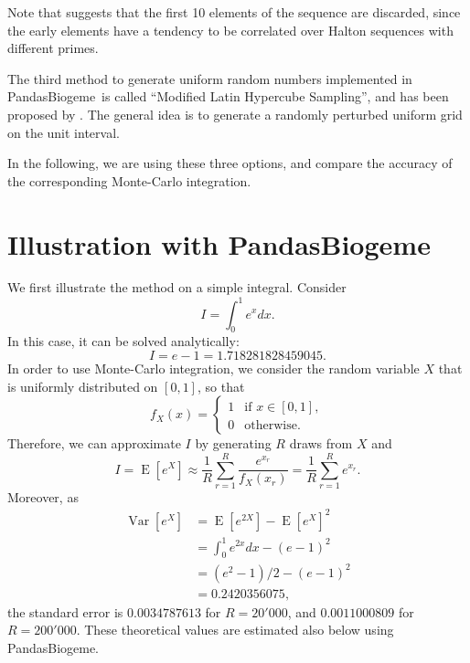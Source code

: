 \documentclass[12pt,a4paper]{article}
\newcommand{\expect}{\operatorname{E}}
\newcommand{\var}{\operatorname{Var}}
\newcommand{\PBIOGEME}{PandasBiogeme}
\begin{document}
Note that  suggests that the first 10 elements of the
sequence are discarded, since the early elements have a tendency to be
correlated over Halton sequences with different primes.

The third method to generate uniform random numbers implemented in
\PBIOGEME\ is called ``Modified Latin Hypercube Sampling'', and has been
proposed by . The general idea is to
generate a randomly perturbed uniform grid on the unit interval.

In the following, we are using these three options, and compare the
accuracy of the corresponding Monte-Carlo integration.


\section{Illustration with \PBIOGEME}
\label{sec:illustration}
We first illustrate the method on a simple integral.
Consider
\begin{equation}
I = \int_0^1 e^x dx.
\end{equation}
In this case, it can be solved analytically:
\begin{equation}
I = e - 1 = 1.718281828459045.
\end{equation}
In order to use Monte-Carlo integration, we consider the random
variable $X$ that is uniformly distributed on $[0,1]$, so that
\begin{equation}
f_X(x) = \left\{
\begin{array}{ll}
1 & \text{if } x \in [0,1], \\
0 & \text{otherwise.}
\end{array}
\right.
\end{equation}
Therefore, we can approximate $I$ by generating $R$ draws from $X$ and
\begin{equation}
\label{eq:simpleMC}
I = \expect[e^X] \approx \frac{1}{R} \sum_{r=1}^R \frac{e^{x_r}}{f_X(x_r)} = \frac{1}{R} \sum_{r=1}^R e^{x_r}.
\end{equation}
Moreover, as
\begin{equation}
\begin{aligned}
\var[e^X] &= \expect[e^{2X}] - \expect[e^X]^2 \\
 &= \int_0^1 e^{2x}dx - (e-1)^2 \\
 &= (e^2-1)/2 - (e-1)^2 \\
 &= 0.2420356075,
\end{aligned}
\end{equation}
 the standard error  is  $0.0034787613$ for $R=20'000$, and
 $0.0011000809$ for
$R=200'000$. These theoretical values are estimated also below using \PBIOGEME. 
\end{document}
